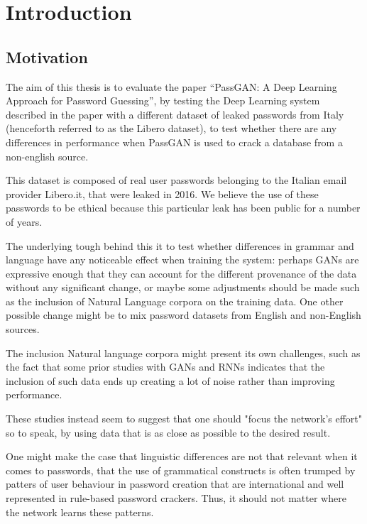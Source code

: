 \section{Introduction}
\subsection{Motivation}
The aim of this thesis is to evaluate the paper \enquote{PassGAN: A Deep Learning Approach for Password Guessing}\cite{PassGAN}, by testing the Deep Learning system described in the paper with a different dataset of leaked passwords from Italy\cite{libero_leak} (henceforth referred to as the Libero dataset), to test whether there are any differences in performance when PassGAN is used to crack a database from a non-english source.\newline

This dataset is composed of real user passwords belonging to the Italian email provider Libero.it, that were leaked in 2016. We believe the use of these passwords to be ethical because this particular leak has been public for a number of years. %
\newline

The underlying tough behind this it to test whether differences in grammar and language have any noticeable effect when training the system: perhaps GANs are expressive enough that they 
can account for the different provenance of the data without any significant change, or maybe some adjustments should be made such as the inclusion of Natural Language corpora on the training data. One other possible change might be to mix password datasets from English and non-English sources.

The inclusion Natural language corpora might present its own challenges, such as the fact that some prior studies with GANs and RNNs indicates that the inclusion of such data ends up creating a lot of noise rather than improving performance\cite{PassGAN, Melicher2016}. %

These studies instead seem to suggest that one should "focus the network's effort" so to speak, by using data that is as close as possible to the desired result.\newline

One might make the case that linguistic differences are not that relevant when it comes to passwords, that the use of grammatical constructs is often trumped by patters of user behaviour in password creation that are international and well represented in rule-based password crackers. Thus, it should not matter where the network learns these patterns.

